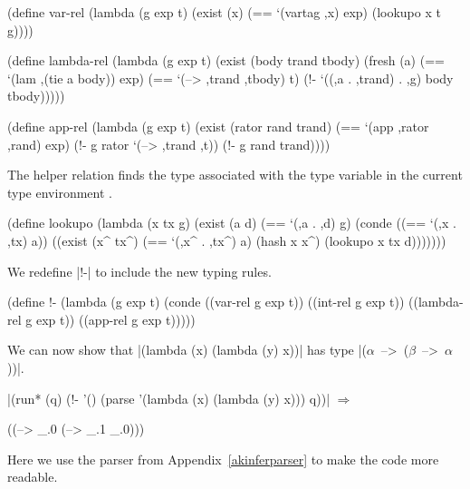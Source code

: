 \schemedisplayspace
\begin{schemedisplay}
(define var-rel
  (lambda (g exp t)
    (exist (x)
      (== `(vartag ,x) exp)
      (lookupo x t g))))
\end{schemedisplay}

\begin{schemedisplay}
(define lambda-rel
  (lambda (g exp t)
    (exist (body trand tbody)
      (fresh (a)
        (== `(lam ,(tie a body)) exp)
        (== `(--> ,trand ,tbody) t)
        (!- `((,a . ,trand) . ,g) body tbody)))))

(define app-rel
  (lambda (g exp t)
    (exist (rator rand trand)
      (== `(app ,rator ,rand) exp)
      (!- g rator `(--> ,trand ,t))
      (!- g rand trand))))
\end{schemedisplay}

\noindent The  helper relation finds the type
 associated with the type variable 
in the current type environment .

\schemedisplayspace
\begin{schemedisplay}
(define lookupo
  (lambda (x tx g)
    (exist (a d)
      (== `(,a . ,d) g)
      (conde
        ((== `(,x . ,tx) a))
        ((exist (x^ tx^)
           (== `(,x^ . ,tx^) a)
           (hash x x^)
           (lookupo x tx d)))))))
\end{schemedisplay}

\noindent We redefine \scheme|!-| to include the new typing rules.

\schemedisplayspace
\begin{schemedisplay}
(define !-
  (lambda (g exp t)
    (conde
      ((var-rel g exp t))
      ((int-rel g exp t))
      ((lambda-rel g exp t))
      ((app-rel g exp t)))))
\end{schemedisplay}

We can now show that \scheme|(lambda (x) (lambda (y) x))|
has type \mbox{\scheme|($\alpha$ --> ($\beta$ --> $\alpha$))|}.

\wspace

\noindent\scheme|(run* (q) (!- '() (parse '(lambda (x) (lambda (y) x))) q))| $\Rightarrow$ \begin{schemeresponsebox}((--> _.0 (--> _.1 _.0)))\end{schemeresponsebox}

\wspace

\noindent Here we use the parser from Appendix~\ref{akinferparser} to make the code more readable.

